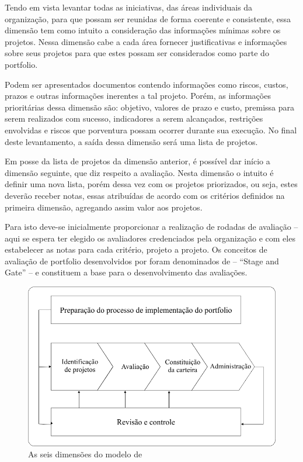 \documentclass[12pt,a4paper,ruledheader,tocpage=prefix,floatnumber=continuous,pagestart=folhaderosto,font=times]{abnt}
\begin{document}
Tendo em vista levantar todas as iniciativas, das áreas individuais da organização, para que possam ser reunidas de forma coerente e consistente, essa 
dimensão tem como intuito a consideração das informações mínimas sobre os projetos. Nessa dimensão cabe a cada área fornecer justificativas e informações
sobre seus projetos para que estes possam ser considerados como parte do portfolio. 

Podem ser apresentados documentos contendo informações como riscos, custos, prazos e outras informações inerentes a tal projeto. Porém, as informações 
prioritárias dessa dimensão são: objetivo, valores de prazo e custo, premissa para serem realizados com sucesso, indicadores a serem alcançados, 
restrições envolvidas e riscos que porventura possam ocorrer durante sua execução. No final deste levantamento, a saída dessa dimensão será uma lista de 
projetos.

Em posse da lista de projetos da dimensão anterior, é possível dar início a dimensão seguinte, que diz respeito a avaliação. Nesta dimensão o intuito é 
definir uma nova lista, porém dessa vez com os projetos priorizados, ou seja, estes deverão receber notas, essas atribuídas de acordo com os critérios 
definidos na primeira dimensão, agregando assim valor aos projetos. 

Para isto deve-se inicialmente proporcionar a realização de rodadas de avaliação – aqui se espera ter elegido os avaliadores credenciados pela organização 
e com eles estabelecer as notas para cada critério, projeto a projeto. Os conceitos de avaliação de portfolio desenvolvidos por \cite{COOPER2001} foram 
denominados de – ``Stage and Gate'' – e constituem a base para o desenvolvimento das avaliações.

\begin{figure}[H]
\centering
\includegraphics[width=.7\textwidth]{img/fig10.png}
\caption{As seis dimensões do modelo de \cite{RABECHINI2005}}
\label{fig:exampleFig1}
\end{figure}
\end{document}
